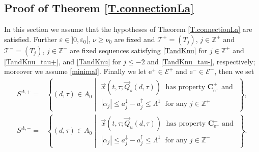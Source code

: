 \documentclass[10pt]{article}
\numberwithin{equation}{section}
\def\ep{\varepsilon}
\def\Z{{\mathbb Z}}
\def\ee{{\mathrm e}}
\def\EE{{\mathcal E}}
\def\TT{{\mathcal T}}
\def\aup{a^{\uparrow}}
\def\adown{a^{\downarrow}}
\def\l1{\Lambda^{1}}
\def\Q{\vec{Q}}
\def\x{\vec{x}}
\newcommand\bs[1]{{\boldsymbol{#1}}}
\theoremstyle{definition}
\theoremstyle{remark}
\begin{document}
\subsection{Proof of Theorem \ref{T.connectionLa}}\label{proof.connection2}


  In this section we assume that   the hypotheses of Theorem \ref{T.connectionLa}   are satisfied.
   Further   $\ep \in ]0, \ep_0[$, $\nu \ge \nu_0$ are fixed and
  $\TT^+=(T_j)$, $j \in \Z^+$ and $\TT^-=(T_j)$, $j \in \Z^-$ are fixed sequences satisfying
    \eqref{TandKnu} for $j \in \Z^+$ and \eqref{TandKnu_tau+}, and \eqref{TandKnu} for $j \le -2$ and \eqref{TandKnu_tau-},
respectively;
  moreover we assume \eqref{minimal}.
  Finally we let $\ee^+ \in \EE^+$ and $\ee^- \in \EE^-$, then we set
 \begin{equation}\label{defS+la}
 \begin{split}
 S^{\Lambda,+}=     &   \left\{ (d,\tau) \in A_0\middle|  \begin{array}{l}
                                      \x(t,\tau ; \Q_s(d,\tau)) \; \textrm{ has property $\bs{C^+_{\ee^+}}$ and } \\
                                      |\alpha_j| \le  \adown_j-\aup_j \le \l1  \; \textrm{ for any $j \in \Z^+$}
                                    \end{array}  \right\},\\
S^{\Lambda,-}= & \left\{ (d,\tau) \in A_0 \middle|  \begin{array}{l}
                                      \x(t,\tau ; \Q_u(d,\tau)) \; \textrm{ has property $\bs{C^-_{\ee^-}}$ and } \\
                                     |\alpha_j| \le \adown_j-\aup_j \le  \l1  \; \textrm{ for any $j \in \Z^-$}
                                    \end{array}  \right\} .
 \end{split}
\end{equation}
\end{document}
